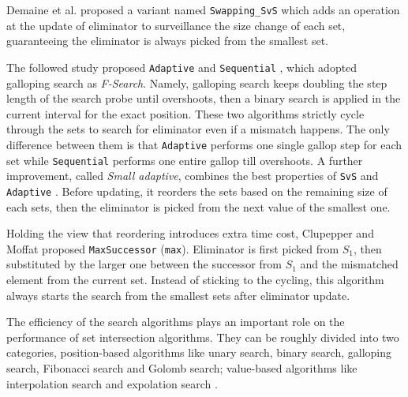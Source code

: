 Demaine et al. \cite{Demaine2001Experiments} proposed a variant named \texttt{Swapping\_SvS} which adds an operation at the update of eliminator to surveillance the size change of each set, guaranteeing the eliminator is always picked from the smallest set.

The followed study proposed \texttt{Adaptive} \cite{Demaine2000Adaptive} and \texttt{Sequential} \cite{barbay2006faster}, which adopted galloping search as \textit{F-Search}.
Namely, galloping search keeps doubling the step length of the search probe until overshoots, then a binary search is applied in the current interval for the exact position.
These two algorithms strictly cycle through the sets to search for eliminator even if a mismatch happens.
The only difference between them is that \texttt{Adaptive} performs one single gallop step for each set while \texttt{Sequential} performs one entire gallop till overshoots.
A further improvement, called \textit{Small adaptive}, combines the best properties of \texttt{SvS} and \texttt{Adaptive} \cite{Demaine2001Experiments}.
Before updating, it reorders the sets based on the remaining size of each sets, then the eliminator is picked from the next value of the smallest one.

Holding the view that reordering introduces extra time cost, Clupepper and Moffat \cite{Culpepper2007Compact} proposed \texttt{MaxSuccessor} (\texttt{max}).
Eliminator is first picked from $ S_1 $, then substituted by the larger one between the successor from $ S_1 $ and the mismatched element from the current set.
Instead of sticking to the cycling, this algorithm always starts the search from the smallest sets after eliminator update.

The efficiency of the search algorithms plays an important role on the performance of set intersection algorithms.
They can be roughly divided into two categories, position-based algorithms like unary search, binary search, galloping search, Fibonacci search and Golomb search; value-based algorithms like interpolation search and expolation search \cite{barbay2006faster}.

